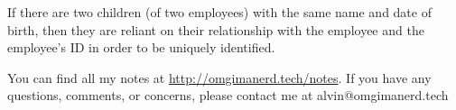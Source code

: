 \documentclass{math}
\begin{document}
If there are two children (of two employees) with the same name and date of
birth, then they are reliant on their relationship with the employee and the
employee's ID in order to be uniquely identified.

\begin{center}
  You can find all my notes at \url{http://omgimanerd.tech/notes}. If you have
  any questions, comments, or concerns, please contact me at
  alvin@omgimanerd.tech
\end{center}
\end{document}
